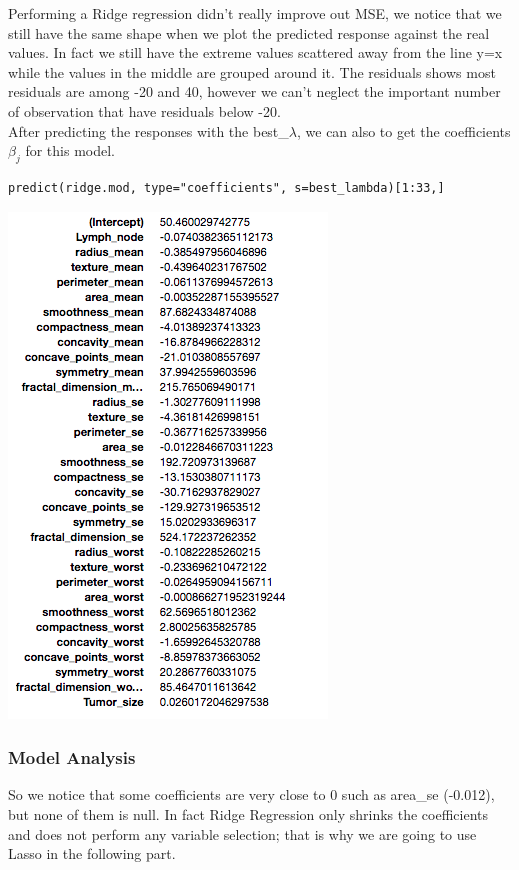 \documentclass[]{report}
\begin{document}
Performing a Ridge regression didn't really improve out MSE, we notice that we still have the same shape when we plot the predicted response against the real values. In fact we still have the extreme values scattered away from the line y=x while the values in the middle are grouped around it. The residuals shows most residuals are among -20 and 40, however we can't neglect the important number of observation that have residuals below -20.\\

After predicting the responses with the best\_$\lambda$,  we can also to get the coefficients $\beta_{j}$ for this model.

\begin{lstlisting}
predict(ridge.mod, type="coefficients", s=best_lambda)[1:33,]
\end{lstlisting}

\begin{center}
	\includegraphics{Figures/ridge_coeff}
\end{center}

\subsubsection{Model Analysis}
So we notice that some coefficients are very close to 0 such as area\_se (-0.012), but none of them is null. In fact Ridge Regression only shrinks the coefficients and does not perform any variable selection;  that is why we are going to use Lasso in the following part.
\end{document}
